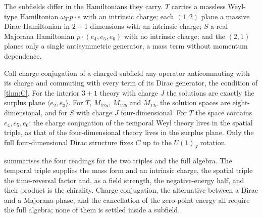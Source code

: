The subfields differ in the Hamiltonians they carry. $T$ carries a massless Weyl-type Hamiltonian $\omega_T\,p\cdot e$ with an intrinsic charge;
each $(1,2)$ plane a massive Dirac Hamiltonian in $2{+}1$ dimensions with an intrinsic charge; $S$ a real Majorana Hamiltonian $p\cdot(e_4,e_5,e_6)$
with no intrinsic charge; and the $(2,1)$ planes only a single antisymmetric generator, a mass term without momentum dependence.

\begin{example}
\label{ex:subC}
Call charge conjugation of a charged subfield any operator anticommuting with its charge and commuting with every term of its Dirac generator,
the condition of \cref{thm:C}. For the interior $3{+}1$ theory with charge $J$ the solutions are exactly the surplus plane $\langle e_2,e_3\rangle$.
For $T$, $M_{12a}$, $M_{12b}$ and $M_{12c}$ the solution spaces are eight-dimensional, and for $S$ with charge $J$ four-dimensional. For $T$ the
space contains $e_4,e_5,e_6$: the charge conjugation of the temporal Weyl theory lives in the spatial triple, as that of the four-dimensional
theory lives in the surplus plane. Only the full four-dimensional Dirac structure fixes $C$ up to the $U(1)_J$ rotation.
\end{example}

 summarises the four readings for the two triples and the full algebra. The temporal triple supplies the mass form and
an intrinsic charge, the spatial triple the time-reversal factor and, as a field strength, the negative-energy half, and their product is the
chirality. Charge conjugation, the alternative between a Dirac and a Majorana phase, and the cancellation of the zero-point energy all require
the full algebra; none of them is settled inside a subfield.

